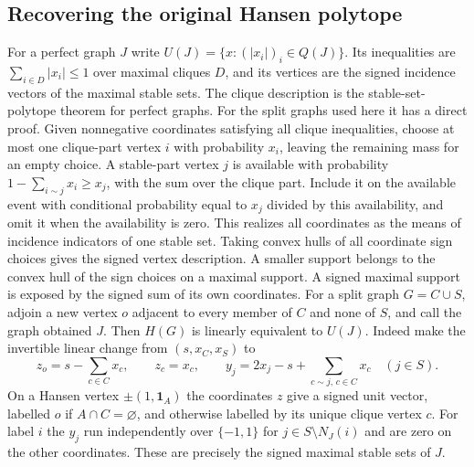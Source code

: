 \documentclass[11pt,a4paper]{article}
\numberwithin{equation}{section}
\begin{document}
\subsection{Recovering the original Hansen polytope}
For a perfect graph $J$ write $U(J)=\{x:(|x_i|)_i\in Q(J)\}$. Its inequalities are $\sum_{i\in D}|x_i|\le1$ over maximal cliques $D$, and its vertices are the signed incidence vectors of the maximal stable sets. The clique description is the stable-set-polytope theorem for perfect graphs. For the split graphs used here it has a direct proof. Given nonnegative coordinates satisfying all clique inequalities, choose at most one clique-part vertex $i$ with probability $x_i$, leaving the remaining mass for an empty choice. A stable-part vertex $j$ is available with probability $1-\sum_{i\sim j}x_i\ge x_j$, with the sum over the clique part. Include it on the available event with conditional probability equal to $x_j$ divided by this availability, and omit it when the availability is zero. This realizes all coordinates as the means of incidence indicators of one stable set. Taking convex hulls of all coordinate sign choices gives the signed vertex description. A smaller support belongs to the convex hull of the sign choices on a maximal support. A signed maximal support is exposed by the signed sum of its own coordinates.
For a split graph $G=C\cup S$, adjoin a new vertex $o$ adjacent to every member of $C$ and none of $S$, and call the graph obtained $J$. Then $H(G)$ is linearly equivalent to $U(J)$. Indeed make the invertible linear change from $(s,x_C,x_S)$ to
\[
 z_o=s-\sum_{c\in C}x_c,\qquad z_c=x_c,\qquad
 y_j=2x_j-s+\sum_{c\sim j,\,c\in C}x_c\quad(j\in S).
\]
On a Hansen vertex $\pm(1,\mathbf1_A)$ the coordinates $z$ give a signed unit vector, labelled $o$ if $A\cap C=\varnothing$, and otherwise labelled by its unique clique vertex $c$. For label $i$ the $y_j$ run independently over $\{-1,1\}$ for $j\in S\setminus N_J(i)$ and are zero on the other coordinates. These are precisely the signed maximal stable sets of $J$.
\end{document}
